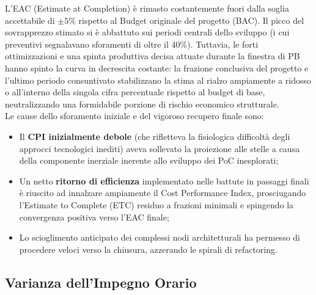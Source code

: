\documentclass[a4paper,11pt,oneside]{scrartcl}
\begin{document}
L'EAC (Estimate at Completion) è rimasto costantemente fuori dalla soglia accettabile di $\pm 5\%$ rispetto al Budget originale del progetto (BAC). Il picco del sovrapprezzo stimato si è abbattuto sui periodi centrali dello sviluppo (i cui preventivi segnalavano sforamenti di oltre il 40\%). Tuttavia, le forti ottimizzazioni e una spinta produttiva decisa attuate durante la finestra di PB hanno spinto la curva in decrescita costante: la frazione conclusiva del progetto e l'ultimo periodo consuntivato stabilizzano la stima al rialzo ampiamente a ridosso o all'interno della singola cifra percentuale rispetto al budget di base, neutralizzando una formidabile porzione di rischio economico strutturale.\\
Le cause dello sforamento iniziale e del vigoroso recupero finale sono:
\begin{itemize}
    \item Il \textbf{CPI inizialmente debole} (che rifletteva la fisiologica difficoltà degli approcci tecnologici inediti) aveva sollevato la proiezione alle stelle a causa della componente inerziale inerente allo sviluppo dei PoC inesplorati;
    \item Un netto \textbf{ritorno di efficienza} implementato nelle battute in passaggi finali è riuscito ad innalzare ampiamente il Cost Performance Index, prosciugando l'Estimate to Complete (ETC) residuo a frazioni minimali e spingendo la convergenza positiva verso l'EAC finale;
    \item Lo scioglimento anticipato dei complessi nodi architetturali ha permesso di procedere veloci verso la chiusura, azzerando le spirali di refactoring.
\end{itemize}

\subsection{Varianza dell'Impegno Orario}
\end{document}

